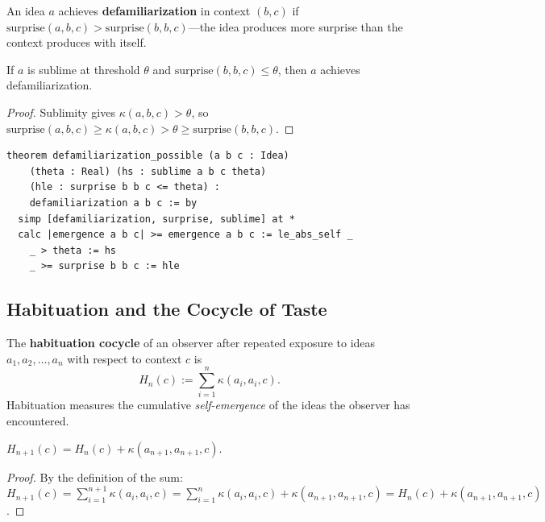 \begin{definition}[Defamiliarization]
\label{def:defamiliarization}
An idea $a$ achieves \textbf{defamiliarization} in context $(b, c)$ if
$\mathrm{surprise}(a, b, c) > \mathrm{surprise}(b, b, c)$---the idea
produces more surprise than the context produces with itself.
\end{definition}

\begin{theorem}
\label{thm:defamiliarization-possible}
If $a$ is sublime at threshold $\theta$ and
$\mathrm{surprise}(b, b, c) \leq \theta$, then $a$ achieves
defamiliarization.
\end{theorem}

\begin{proof}
Sublimity gives $\kappa(a, b, c) > \theta$, so
$\mathrm{surprise}(a, b, c) \geq \kappa(a, b, c) > \theta
 \geq \mathrm{surprise}(b, b, c)$.
\end{proof}

\begin{lstlisting}
theorem defamiliarization_possible (a b c : Idea)
    (theta : Real) (hs : sublime a b c theta)
    (hle : surprise b b c <= theta) :
    defamiliarization a b c := by
  simp [defamiliarization, surprise, sublime] at *
  calc |emergence a b c| >= emergence a b c := le_abs_self _
    _ > theta := hs
    _ >= surprise b b c := hle
\end{lstlisting}

\subsection{Habituation and the Cocycle of Taste}

\begin{definition}[Habituation]
\label{def:habituation-aesthetics}
The \textbf{habituation cocycle} of an observer after repeated exposure
to ideas $a_1, a_2, \ldots, a_n$ with respect to context $c$ is
\[
  H_n(c) := \sum_{i=1}^{n} \kappa(a_i, a_i, c).
\]
Habituation measures the cumulative \emph{self-emergence} of the ideas
the observer has encountered.
\end{definition}

\begin{theorem}
\label{thm:habituation-additive}
$H_{n+1}(c) = H_n(c) + \kappa(a_{n+1}, a_{n+1}, c)$.
\end{theorem}

\begin{proof}
By the definition of the sum: $H_{n+1}(c) = \sum_{i=1}^{n+1}
\kappa(a_i, a_i, c) = \sum_{i=1}^{n} \kappa(a_i, a_i, c) +
\kappa(a_{n+1}, a_{n+1}, c) = H_n(c) + \kappa(a_{n+1}, a_{n+1}, c)$.
\end{proof}

